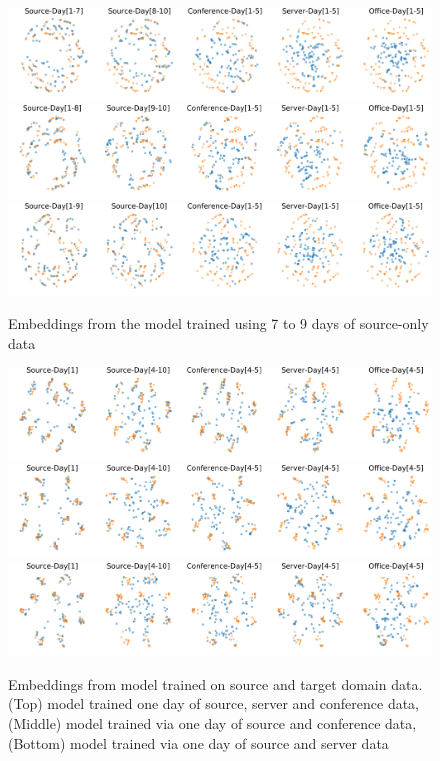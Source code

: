 \documentclass{article}
\begin{document}
\begin{figure}[H]
\includegraphics[width=\linewidth]{figures_supp/TargetLabelled700.png} 
\includegraphics[width=\linewidth]{figures_supp/TargetLabelled800.png} 
\includegraphics[width=\linewidth]{figures_supp/TargetLabelled900.png} 
\caption{Embeddings from the model trained using 7 to 9 days of source-only data}
\label{src2}
\end{figure}

\begin{figure}[H]
\includegraphics[width=\linewidth]{figures_supp/TargetLabelled111.png} 
\includegraphics[width=\linewidth]{figures_supp/TargetLabelled101.png} 
\includegraphics[width=\linewidth]{figures_supp/TargetLabelled110.png} 
\caption{Embeddings from model trained on source and target domain data. (Top) model trained one day of source, server and conference data, (Middle) model trained via one day of source and conference data, (Bottom) model trained via one day of source and server data}
\label{trg1}
\end{figure}
\end{document}
